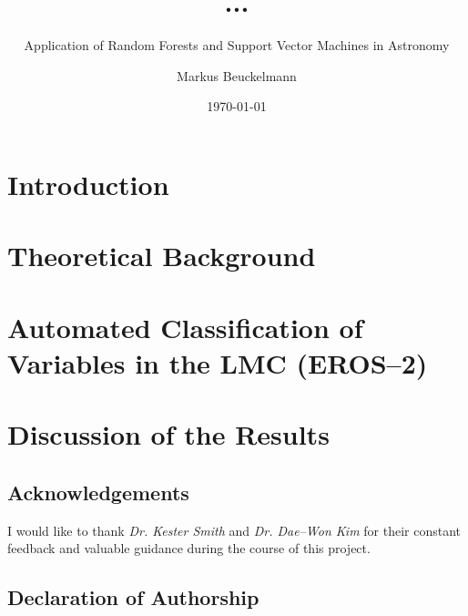 

\title{...}
\subtitle{Application of Random Forests and Support Vector Machines in Astronomy}

\author{Markus Beuckelmann}
\date{\today}






\label{sec:abstract}

\tableofcontents

\chapter{Introduction}
\label{sec:introduction}


\let\cleardoublepage\clearpage
\chapter{Theoretical Background}
\label{sec:theory}


\chapter{Automated Classification of Variables in the LMC (EROS--2)}
\label{sec:main}


%

\chapter{Discussion of the Results}
\label{sec:discussion}


\cleardoublepage
{}
\listoffigures

\cleardoublepage
{}




\cleardoublepage

\section*{Acknowledgements}
I would like to thank \emph{Dr. Kester Smith} and \emph{Dr. Dae--Won Kim} for their constant feedback and valuable guidance during the course of this project.
\label{sec:acknowledgements}

\section*{Declaration of Authorship}

\label{sec:declaration}


